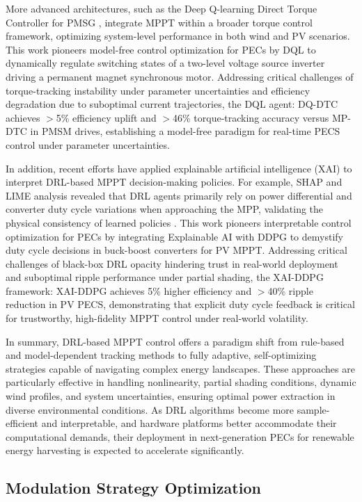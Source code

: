More advanced architectures, such as the Deep Q-learning Direct Torque Controller for PMSG \cite{schenke2021deep}, integrate MPPT within a broader torque control framework, optimizing system-level performance in both wind and PV scenarios. This work pioneers model-free control optimization for PECs by DQL to dynamically regulate switching states of a two-level voltage source inverter driving a permanent magnet synchronous motor. Addressing critical challenges of torque-tracking instability under parameter uncertainties and efficiency degradation due to suboptimal current trajectories, the DQL agent: DQ-DTC achieves $>$5\% efficiency uplift and $>$46\% torque-tracking accuracy versus MP-DTC in PMSM drives, establishing a model-free paradigm for real-time PECS control under parameter uncertainties.

In addition, recent efforts have applied explainable artificial intelligence (XAI) to interpret DRL-based MPPT decision-making policies. For example, SHAP and LIME analysis revealed that DRL agents primarily rely on power differential and converter duty cycle variations when approaching the MPP, validating the physical consistency of learned policies \cite{tan2022explainable}. This work pioneers interpretable control optimization for PECs by integrating Explainable AI with DDPG to demystify duty cycle decisions in buck-boost converters for PV MPPT. Addressing critical challenges of black-box DRL opacity hindering trust in real-world deployment and suboptimal ripple performance under partial shading, the XAI-DDPG framework: XAI-DDPG achieves 5\% higher efficiency and $>$40\% ripple reduction in PV PECS, demonstrating that explicit duty cycle feedback is critical for trustworthy, high-fidelity MPPT control under real-world volatility.

In summary, DRL-based MPPT control offers a paradigm shift from rule-based and model-dependent tracking methods to fully adaptive, self-optimizing strategies capable of navigating complex energy landscapes. These approaches are particularly effective in handling nonlinearity, partial shading conditions, dynamic wind profiles, and system uncertainties, ensuring optimal power extraction in diverse environmental conditions. As DRL algorithms become more sample-efficient and interpretable, and hardware platforms better accommodate their computational demands, their deployment in next-generation PECs for renewable energy harvesting is expected to accelerate significantly.

\subsection{Modulation Strategy Optimization}
\label{sec:ctrl_modulation}

